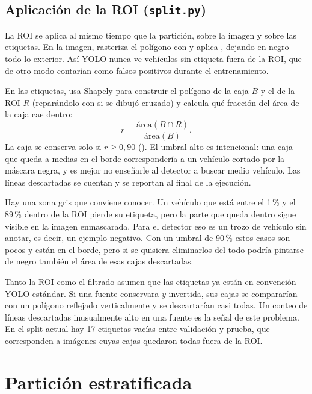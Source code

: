 \documentclass[11pt,a4paper]{article}
\begin{document}
\subsection{Aplicación de la ROI (\texorpdfstring{\texttt{split.py}}{split.py})}

La ROI se aplica al mismo tiempo que la partición, sobre la imagen y sobre las etiquetas. En la imagen,  rasteriza el polígono con  y aplica , dejando en negro todo lo exterior. Así YOLO nunca ve vehículos sin etiqueta fuera de la ROI, que de otro modo contarían como falsos positivos durante el entrenamiento.

En las etiquetas,  usa Shapely para construir el polígono de la caja $B$ y el de la ROI $R$ (reparándolo con  si se dibujó cruzado) y calcula qué fracción del área de la caja cae dentro:
\[
r = \frac{\text{área}(B \cap R)}{\text{área}(B)} .
\]
La caja se conserva solo si $r \ge 0{,}90$ (). El umbral alto es intencional: una caja que queda a medias en el borde correspondería a un vehículo cortado por la máscara negra, y es mejor no enseñarle al detector a buscar medio vehículo. Las líneas descartadas se cuentan y se reportan al final de la ejecución.

Hay una zona gris que conviene conocer. Un vehículo que está entre el 1\,\% y el 89\,\% dentro de la ROI pierde su etiqueta, pero la parte que queda dentro sigue visible en la imagen enmascarada. Para el detector eso es un trozo de vehículo sin anotar, es decir, un ejemplo negativo. Con un umbral de 90\,\% estos casos son pocos y están en el borde, pero si se quisiera eliminarlos del todo podría pintarse de negro también el área de esas cajas descartadas.

Tanto la ROI como el filtrado asumen que las etiquetas ya están en convención YOLO estándar. Si una fuente conservara $y$ invertida, sus cajas se compararían con un polígono reflejado verticalmente y se descartarían casi todas. Un conteo de líneas descartadas inusualmente alto en una fuente es la señal de este problema. En el split actual hay 17 etiquetas vacías entre validación y prueba, que corresponden a imágenes cuyas cajas quedaron todas fuera de la ROI.

\section{Partición estratificada}
\end{document}
